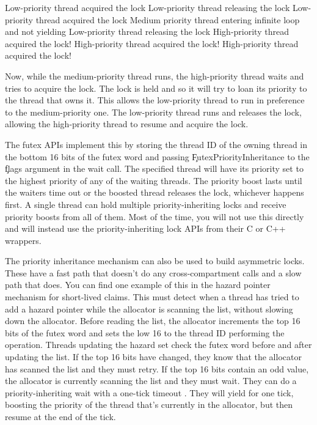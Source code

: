 \begin{console}
Low-priority thread acquired the lock
Low-priority thread releasing the lock
Low-priority thread acquired the lock
Medium priority thread entering infinite loop and not yielding
Low-priority thread releasing the lock
High-priority thread acquired the lock!
High-priority thread acquired the lock!
High-priority thread acquired the lock!
\end{console}

Now, while the medium-priority thread runs, the high-priority thread waits and tries to acquire the lock.
The lock is held and so it will try to loan its priority to the thread that owns it.
This allows the low-priority thread to run in preference to the medium-priority one.
The low-priority thread runs and releases the lock, allowing the high-priority thread to resume and acquire the lock.

The futex APIs implement this by storing the thread ID of the owning thread in the bottom 16 bits of the futex word and passing \c{FutexPriorityInheritance} to the \c{flags} argument in the wait call.
The specified thread will have its priority set to the highest priority of any of the waiting threads.
The priority boost lasts until the waiters time out or the boosted thread releases the lock, whichever happens first.
A single thread can hold multiple priority-inheriting locks and receive priority boosts from all of them.
Most of the time, you will not use this directly and will instead use the priority-inheriting lock APIs from their C or C++ wrappers.

The priority inheritance mechanism can also be used to build asymmetric locks.
These have a fast path that doesn't do any cross-compartment calls and a slow path that does.
You can find one example of this in the hazard pointer mechanism for short-lived claims.
This must detect when a thread has tried to add a hazard pointer while the allocator is scanning the list, without slowing down the allocator.
Before reading the list, the allocator increments the top 16 bits of the futex word and sets the low 16 to the thread ID performing the operation.
Threads updating the hazard set check the futex word before and after updating the list.
If the top 16 bits have changed, they know that the allocator has scanned the list and they must retry.
If the top 16 bits contain an odd value, the allocator is currently scanning the list and they must wait.
They can do a priority-inheriting wait with a one-tick timeout .
They will yield for one tick, boosting the priority of the thread that's currently in the allocator, but then resume at the end of the tick.


